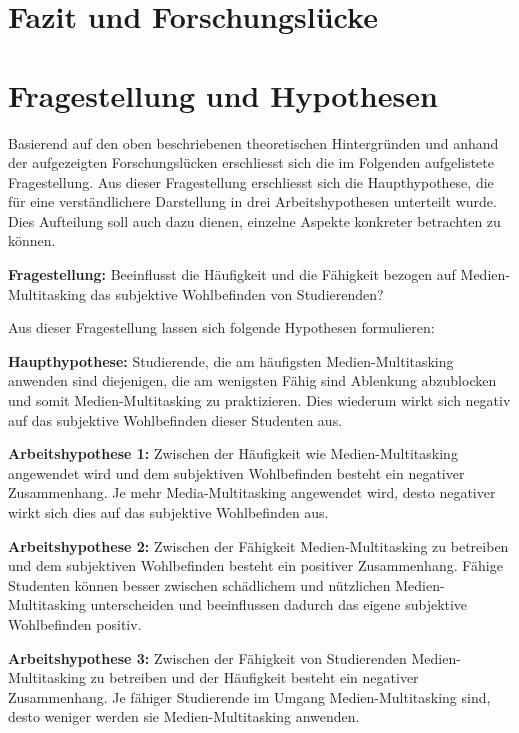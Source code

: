 \section{Fazit und Forschungslücke}\label{section.fazitLücke}

\section{Fragestellung und Hypothesen}\label{section.fragestellung}
Basierend auf den oben beschriebenen theoretischen Hintergründen und anhand der aufgezeigten Forschungslücken erschliesst sich die im Folgenden aufgelistete Fragestellung. Aus dieser Fragestellung erschliesst sich die Haupthypothese, die für eine verständlichere Darstellung in drei Arbeitshypothesen unterteilt wurde. Dies Aufteilung soll auch dazu dienen, einzelne Aspekte konkreter betrachten zu können. \par
\textbf{Fragestellung:} Beeinflusst die Häufigkeit und die Fähigkeit bezogen auf Medien-Multitasking das subjektive Wohlbefinden von Studierenden?\par
Aus dieser Fragestellung lassen sich folgende Hypothesen formulieren:\par
\textbf{Haupthypothese:}
Studierende, die am häufigsten Medien-Multitasking anwenden sind diejenigen, die am wenigsten Fähig sind Ablenkung abzublocken und somit Medien-Multitasking zu praktizieren. Dies wiederum wirkt sich negativ auf das subjektive Wohlbefinden dieser Studenten aus.\par
\textbf{Arbeitshypothese 1:} Zwischen der Häufigkeit wie Medien-Multitasking angewendet wird und dem subjektiven Wohlbefinden besteht ein negativer Zusammenhang. Je mehr Media-Multitasking angewendet wird, desto negativer wirkt sich dies auf das subjektive Wohlbefinden aus.\par
\textbf{Arbeitshypothese 2:} Zwischen der Fähigkeit Medien-Multitasking zu betreiben und dem subjektiven Wohlbefinden besteht ein positiver Zusammenhang. Fähige Studenten können besser zwischen schädlichem und nützlichen Medien-Multitasking unterscheiden und beeinflussen dadurch das eigene subjektive Wohlbefinden positiv.\par
\textbf{Arbeitshypothese 3:} Zwischen der Fähigkeit von Studierenden Medien-Multitasking zu betreiben und der Häufigkeit besteht ein negativer Zusammenhang. Je fähiger Studierende im Umgang Medien-Multitasking sind, desto weniger werden sie Medien-Multitasking anwenden.





